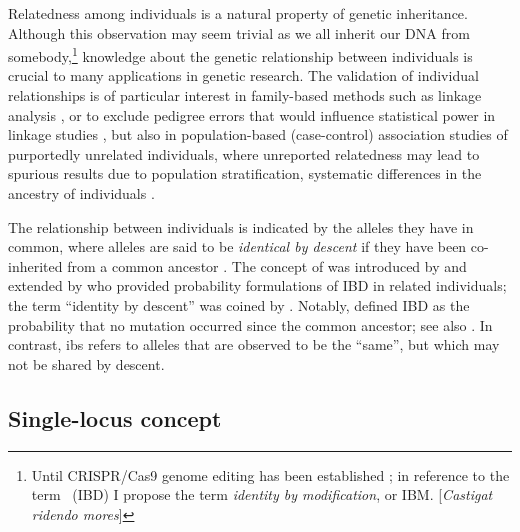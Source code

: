 Relatedness among individuals is a natural property of genetic inheritance.
Although this observation may seem trivial as we all inherit our DNA from somebody,\footnote{Until CRISPR/Cas9 genome editing has been established \citep[\eg see][]{Cai:2016km}; in reference to the term \emph{}~(IBD) I propose the term \emph{identity by modification}, or IBM. {\color{oxgray}[\textit{Castigat ridendo mores}]}} knowledge about the genetic relationship between individuals is crucial to many applications in genetic research.
The validation of individual relationships is of particular interest in family-based methods such as linkage analysis \citep{Purcell:2007dg,Albrechtsen:2009cb}, or to exclude pedigree errors that would influence statistical power in linkage studies \citep{Boehnke:1997ku}, but also in population-based (case-control) association studies of purportedly unrelated individuals, where unreported relatedness may lead to spurious results due to population stratification, \ie systematic differences in the ancestry of individuals \citep{Freedman:2004dk,Voight:2005cr}.

The relationship between individuals is indicated by the alleles they have in common, where  alleles are said to be \emph{identical by descent} if they have been co-inherited from a common ancestor \citep{Thompson:1974fi,Thompson:1975uu}.
The concept of  was introduced by \citet{cotterman1940calculus} and extended by \citet{malecot1948mathematics} who provided probability formulations of IBD in related individuals; the term ``identity by descent'' was coined by \citet{crow1954}.
Notably, \citet{malecot1948mathematics} defined IBD as the probability that no mutation occurred since the common ancestor; see also \citet{Slatkin:2008by}.
In contrast, \gls{ibs} refers to alleles that are observed to be the ``same'', but which may not be shared by descent.

%
\subsection{Single-locus concept}
%

